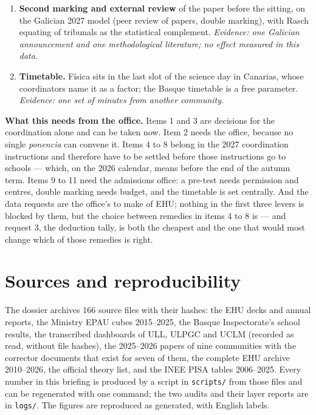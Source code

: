 \documentclass[
  10.5pt,
  a4paper,
  DIV=11,
  numbers=noendperiod]{scrartcl}
\begin{document}
\begin{enumerate}
{  communities' ponencias; its effect here is untested.}
\item
  \textbf{Second marking and external review} of the paper before the
  sitting, on the Galician 2027 model (peer review of papers, double
  marking), with Rasch equating of tribunals as the statistical
  complement. \emph{Evidence: one Galician announcement and one
  methodological literature; no effect measured in this data.}
\item
  \textbf{Timetable.} Física sits in the last slot of the science day in
  Canarias, whose coordinators name it as a factor; the Basque timetable
  is a free parameter. \emph{Evidence: one set of minutes from another
  community.}
\end{enumerate}

\textbf{What this needs from the office.} Items 1 and 3 are decisions
for the coordination alone and can be taken now. Item 2 needs the
office, because no single \emph{ponencia} can convene it. Items 4 to 8
belong in the 2027 coordination instructions and therefore have to be
settled before those instructions go to schools --- which, on the 2026
calendar, means before the end of the autumn term. Items 9 to 11 need
the admissions office: a pre-test needs permission and centres, double
marking needs budget, and the timetable is set centrally. And the data
requests are the office's to make of EHU; nothing in the first three
levers is blocked by them, but the choice between remedies in items 4 to
8 is --- and request 3, the deduction tally, is both the cheapest and
the one that would most change which of those remedies is right.

\section{Sources and reproducibility}\label{sources-and-reproducibility}

The dossier archives 166 source files with their hashes: the EHU decks
and annual reports, the Ministry EPAU cubes 2015--2025, the Basque
Inspectorate's school results, the transcribed dashboards of ULL, ULPGC
and UCLM (recorded as read, without file hashes), the 2025--2026 papers
of nine communities with the corrector documents that exist for seven of
them, the complete EHU archive 2010--2026, the official theory list, and
the INEE PISA tables 2006--2025. Every number in this briefing is
produced by a script in \texttt{scripts/} from those files and can be
regenerated with one command; the two audits and their layer reports are
in \texttt{logs/}. The figures are reproduced as generated, with English
labels.
\end{document}
